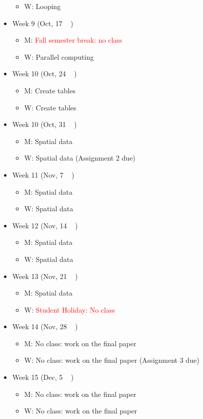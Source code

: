 \documentclass[12pt]{article}
\begin{document}
\begin{itemize}
\begin{itemize}
    \item W: Looping
  \end{itemize}
  \item Week 9 (Oct, 17 ~ )
  \begin{itemize}
    \item M: \textcolor{red}{Fall semester break: no class}
    \item W: Parallel computing
  \end{itemize}
  \item Week 10 (Oct, 24 ~ )
  \begin{itemize}
    \item M: Create tables
    \item W: Create tables 
  \end{itemize}
  \item Week 10 (Oct, 31 ~ )
  \begin{itemize}
    \item M: Spatial data
    \item W: Spatial data (Assignment 2 due)
  \end{itemize}
  \item Week 11 (Nov, 7 ~ )
  \begin{itemize}
    \item M: Spatial data
    \item W: Spatial data
  \end{itemize}
  \item Week 12 (Nov, 14 ~ )
  \begin{itemize}
    \item M: Spatial data
    \item W: Spatial data
  \end{itemize}
  \item Week 13 (Nov, 21 ~ )
  \begin{itemize}
    \item M: Spatial data
    \item W: \textcolor{red}{Student Holiday: No class}
  \end{itemize}
  \item Week 14 (Nov, 28 ~ )
  \begin{itemize}
    \item M: No class: work on the final paper
    \item W: No class: work on the final paper (Assignment 3 due)
  \end{itemize}
  \item Week 15 (Dec, 5 ~ )
  \begin{itemize}
    \item M: No class: work on the final paper
    \item W: No class: work on the final paper
  \end{itemize}
\end{itemize}
\end{document}
